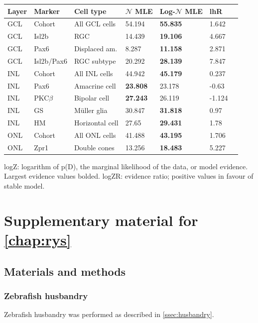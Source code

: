 \documentclass{ut-thesis}
\begin{document}
\begin{NoHyper}
\begin{table}[!ht]
    \begin{tabular}{|l|l|l|l|l|l|l|} 
        \hline
        {\bf Layer} & {\bf Marker} & {\bf Cell type} & {\bf $\mathcal{N}$ MLE} & {\bf Log-$\mathcal{N}$ MLE} & {\bf lhR}\\ \hline \hline
        GCL & Cohort & All GCL cells & 54.194 & {\bf 55.835} & 1.642\\ \hline
        GCL & Isl2b & RGC & 14.439 & {\bf 19.106} & 4.667\\ \hline
        GCL & Pax6 & Displaced am. &  8.287 & {\bf 11.158} & 2.871\\ \hline
        GCL & Isl2b/Pax6 & RGC subtype & 20.292 & {\bf 28.139} & 7.847\\ \hline
        INL & Cohort & All INL cells & 44.942 & {\bf 45.179} & 0.237\\ \hline
        INL & Pax6 & Amacrine cell & {\bf 23.808} & 23.178 & -0.63\\ \hline
        INL & PKC$\beta$ & Bipolar cell & {\bf 27.243} & 26.119 & -1.124\\ \hline
        INL & GS & M\"{u}ller glia & 30.847 & {\bf 31.818} & 0.97\\ \hline
        INL & HM & Horizontal cell & 27.65 & {\bf 29.431} & 1.78\\ \hline
        ONL & Cohort & All ONL cells & 41.488 & {\bf 43.195} & 1.706\\ \hline
        ONL & Zpr1 & Double cones & 13.256 & {\bf 18.483} & 5.227\\ \hline
    \end{tabular}

    \begin{flushleft}logZ: logarithm of p(D), the marginal likelihood of the data, or model evidence.  Largest evidence values bolded. logZR: evidence ratio; positive values in favour of stable model.
    \end{flushleft}
    \label{lineage_lhratio}
\end{table}



\chapter{Supplementary material for \autoref{chap:rys}}
\section{Materials and methods}
\subsection{Zebrafish husbandry}
Zebrafish husbandry was performed as described in \autoref{ssec:husbandry}.


\end{NoHyper}
\end{document}
